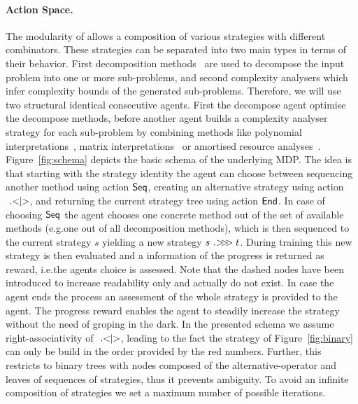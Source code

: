 \documentclass[envcountsame]{llncs}
\begin{document}
\begin{figure*}[t!]
  \centering
  \caption{\label{fig:schema}Schema of the MDP for a average reward adjusted RL agent.} 
\end{figure*}

\paragraph{Action Space.} The modularity of \tct{} allows a composition of various strategies with
different combinators. These strategies can be separated into two main types in terms of their
behavior. First decomposition methods~\cite{avanzini2013combination} are used to decompose the input
problem into one or more sub-problems, and second complexity analysers which infer complexity bounds
of the generated sub-problems. Therefore, we will use two structural identical consecutive agents.
First the decompose agent optimise the decompose methods, before another agent builds a complexity
analyser strategy for each sub-problem by combining methods like polynomial
interpretations~\cite{hirokawa2008automated}, matrix interpretations~\cite{moser2008complexity} or
amortised resource analyses~\cite{moser2020automated}. Figure~\ref{fig:schema} depicts the basic
schema of the underlying MDP\@. The idea is that starting with the strategy \textsf{identity} the
agent can choose between sequencing another method using action \(\mathsf{Seq}\), creating an alternative
strategy using action \(\ .\hspace{-3.0pt}<\hspace{-3.0pt}|\hspace{-3.0pt}>\), and returning the current strategy tree using action \(\mathsf{End}\).
%
%
In case of choosing \(\mathsf{Seq}\) the agent chooses one concrete method out of the set of available
methods (e.g.\@ one out of all decomposition methods), which is then sequenced to the current
strategy \(s\) yielding a new strategy \(s \ .\hspace{-2.5pt}>\hspace{-3.0pt}>\hspace{-3.0pt}> t\). During training this new strategy is then
evaluated and a information of the progress is returned as reward, i.e.\@ the agents choice is
assessed. Note that the dashed nodes have been introduced to increase readability only and actually
do not exist. In case the agent ends the process an assessment of the whole strategy is provided to
the agent. The progress reward enables the agent to steadily increase the strategy without the need
of groping in the dark. In the presented schema we assume right-associativity of \(\ .\hspace{-3.0pt}<\hspace{-3.0pt}|\hspace{-3.0pt}>\), leading
to the fact the strategy of Figure~\ref{fig:binary} can only be build in the order provided by the
red numbers. Further, this restricts to binary trees with nodes composed of the alternative-operator
and leaves of sequences of strategies, thus it prevents ambiguity. To avoid an infinite composition
of strategies we set a maximum number of possible iterations.
\end{document}

